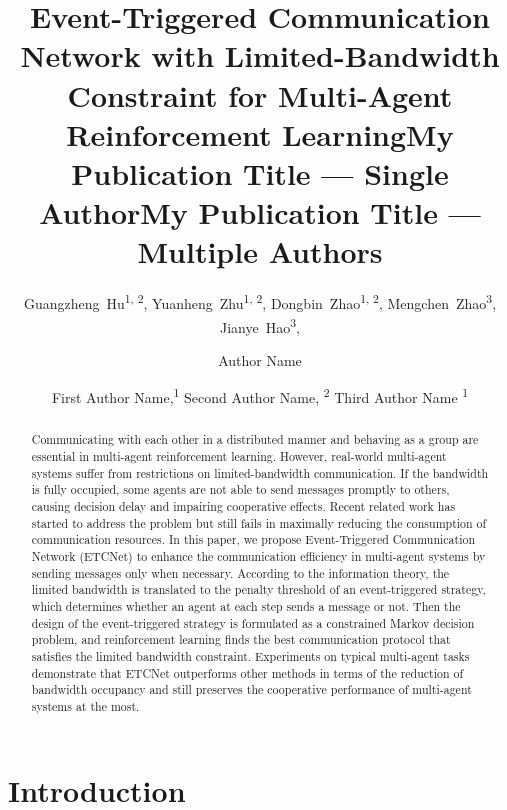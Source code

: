 \documentclass[letterpaper]{article} %
\title{Event-Triggered Communication Network with Limited-Bandwidth Constraint for Multi-Agent Reinforcement Learning}
\author{
    Guangzheng~Hu\textsuperscript{\rm 1, \rm 2},
    Yuanheng~Zhu\textsuperscript{\rm 1, \rm 2},
    Dongbin~Zhao\textsuperscript{\rm 1, \rm 2},
    Mengchen~Zhao\textsuperscript{\rm 3},
    Jianye~Hao\textsuperscript{\rm 3},
}
\title{My Publication Title --- Single Author}
\author {
    Author Name \\
}
\title{My Publication Title --- Multiple Authors}
\author {

        First Author Name,\textsuperscript{\rm 1}
        Second Author Name, \textsuperscript{\rm 2}
        Third Author Name \textsuperscript{\rm 1} \\
}
\begin{document}
\maketitle

\begin{abstract}
Communicating with each other in a distributed manner and behaving as a group are essential in multi-agent reinforcement learning. However, real-world multi-agent systems suffer from restrictions on limited-bandwidth communication. If the bandwidth is fully occupied, some agents are not able to send messages promptly to others, causing decision delay and impairing cooperative effects. Recent related work has started to address the problem but still fails in maximally reducing the consumption of communication resources. In this paper, we propose Event-Triggered Communication Network (ETCNet) to enhance the communication efficiency in multi-agent systems by sending messages only when necessary. According to the information theory, the limited bandwidth is translated to the penalty threshold of an event-triggered strategy, which determines whether an agent at each step sends a message or not. Then the design of the event-triggered strategy is formulated as a constrained Markov decision problem, and reinforcement learning finds the best communication protocol that satisfies the limited bandwidth constraint. Experiments on typical multi-agent tasks demonstrate that ETCNet outperforms other methods in terms of the reduction of bandwidth occupancy and still preserves the cooperative performance of multi-agent systems at the most.
\end{abstract}






\section{Introduction}\label{sec:introduction}
\end{document}
